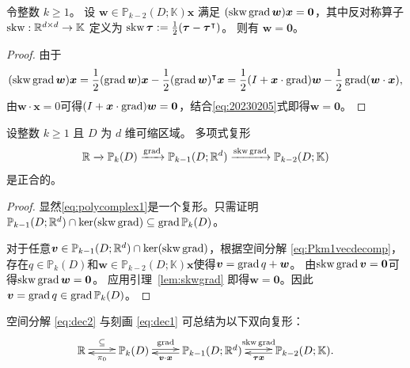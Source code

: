 \begin{lemma}\label{lem:skwgrad}
令整数 $k \geq 1$。
设 $\boldsymbol{w}\in\mathbb P_{k-2}(D;\mathbb K)\boldsymbol{x}$ 满足 $(\operatorname{skw}\operatorname{grad}\boldsymbol{w})\boldsymbol{x}=\boldsymbol{0}$，其中反对称算子 $\operatorname{skw}:\mathbb R^{d\times d}\to\mathbb K$ 定义为 $\operatorname{skw}\boldsymbol{\tau}:=\frac{1}{2}(\boldsymbol{\tau}-\boldsymbol{\tau}^{\intercal})$。
则有 $\boldsymbol{w}=\boldsymbol{0}$。
\end{lemma}
\begin{proof}
由于
\begin{equation*}%
(\skw\grad\boldsymbol{w})\boldsymbol{x}=\frac{1}{2}(\grad\boldsymbol{w})\boldsymbol{x}-\frac{1}{2}(\grad\boldsymbol{w})^{\intercal}\boldsymbol{x}=\frac{1}{2}(I+\boldsymbol{x}\cdot\grad)\boldsymbol{w} - \frac{1}{2}\grad(\boldsymbol{w}\cdot\boldsymbol{x}),
\end{equation*}
由$\boldsymbol{w}\cdot\boldsymbol{x}=0$可得$(I+\boldsymbol{x}\cdot\operatorname{grad})\boldsymbol{w}=\boldsymbol{0}$，结合\eqref{eq:20230205}式即得$\boldsymbol{w}=\boldsymbol{0}$。
\end{proof}

\begin{lemma}
设整数 $k \geq 1$ 且 $D$ 为 $d$ 维可缩区域。 
多项式复形
\begin{equation}\label{eq:polycomplex1}
\mathbb R\xrightarrow{}\mathbb P_k(D)\xrightarrow{\operatorname{grad}}\mathbb P_{k-1}(D;\mathbb R^d)\xrightarrow{\operatorname{skw}\operatorname{grad}}\mathbb P_{k-2}(D;\mathbb K)
\end{equation}
是正合的。
\end{lemma}
\begin{proof}
显然\eqref{eq:polycomplex1}是一个复形。只需证明$\mathbb P_{k-1}(D;\mathbb R^d)\cap\ker(\operatorname{skw}\operatorname{grad})\subseteq\operatorname{grad}\mathbb P_{k}(D)$。

对于任意$\boldsymbol{v}\in\mathbb P_{k-1}(D;\mathbb R^d)\cap\ker(\operatorname{skw}\operatorname{grad})$，根据空间分解 \eqref{eq:Pkm1vecdecomp}，存在$q\in \mathbb P_k(D)$和$\boldsymbol{w}\in\mathbb P_{k-2}(D;\mathbb K)\boldsymbol{x}$使得$\boldsymbol{v}=\operatorname{grad} q+\boldsymbol{w}$。
由$\operatorname{skw}\operatorname{grad}\boldsymbol{v}=\boldsymbol{0}$可得$\operatorname{skw}\operatorname{grad}\boldsymbol{w}=\boldsymbol{0}$。
应用引理~\ref{lem:skwgrad} 即得$\boldsymbol{w}=\boldsymbol{0}$。因此$\boldsymbol{v}=\operatorname{grad} q\in\operatorname{grad}\mathbb P_k(D)$。
\end{proof}



空间分解 \eqref{eq:dec2} 与刻画 \eqref{eq:dec1} 可总结为以下双向复形：
\begin{equation*}%
\xymatrix{
\mathbb R\ar@<0.4ex>[r]^-{\subseteq} & \mathbb P_{k}(D)\ar@<0.4ex>[r]^-{\grad} \ar@<0.4ex>[l]^-{\pi_0}  & \mathbb P_{k-1}(D;\mathbb R^d)\ar@<0.4ex>[r]^-{\skw\grad}\ar@<0.4ex>[l]^-{\boldsymbol v\cdot\boldsymbol x}  & \mathbb P_{k-2}(D;\mathbb K) \ar@<0.4ex>[l]^-{\boldsymbol\tau\boldsymbol x}.
}
\end{equation*}



